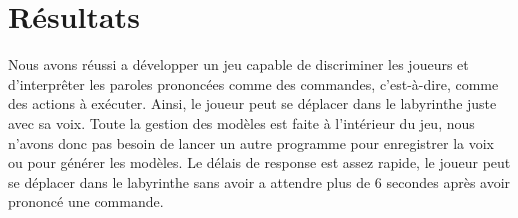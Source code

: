 \section{Résultats}
\label{sec:resultats}

Nous avons réussi a développer un jeu capable de discriminer les joueurs et d'interprêter les paroles prononcées comme des commandes, c'est-à-dire, comme des actions à exécuter.
Ainsi, le joueur peut se déplacer dans le labyrinthe juste avec sa voix. Toute la gestion des modèles est faite à l'intérieur du jeu,
nous n'avons donc pas besoin de lancer un autre programme pour enregistrer la voix ou pour générer les modèles.
Le délais de response est assez rapide, le joueur peut se déplacer dans le labyrinthe sans avoir a attendre plus de 6 secondes
après avoir prononcé une commande.

